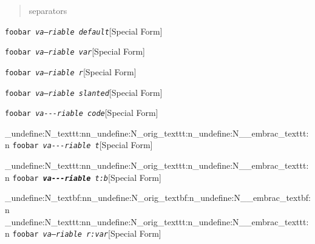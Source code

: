 \documentclass{book}
\begin{document}
%
\begin{quote}
\unskip{\parskip=0pt\noindent}%
separators
\end{quote}

\noindent\texttt{foobar \EmbracOn{}\textnormal{\textsl{va---riable default}}\EmbracOff{}}\hfill[Special Form]



%
\noindent\texttt{foobar \EmbracOn{}\textnormal{\textsl{\textsl{va---riable} var}}\EmbracOff{}}\hfill[Special Form]



%
\noindent\texttt{foobar \EmbracOn{}\textnormal{\textsl{\EmbracOff{}\textnormal{va---riable}\EmbracOn{} r}}\EmbracOff{}}\hfill[Special Form]



%
\noindent\texttt{foobar \EmbracOn{}\textnormal{\textsl{\textsl{va---riable} slanted}}\EmbracOff{}}\hfill[Special Form]



%
\noindent\texttt{foobar \EmbracOn{}\textnormal{\textsl{\texttt{va{-}{-}{-}riable} code}}\EmbracOff{}}\hfill[Special Form]


\ExplSyntaxOn%
\cs_undefine:N{\embrac_texttt:nn}\cs_undefine:N{\embrac_orig_texttt:n}\cs_undefine:N{\__embrac_texttt:n}%
\ExplSyntaxOff%
%
\noindent\texttt{foobar \EmbracOn{}\textnormal{\textsl{\texttt{va{-}{-}{-}riable} t}}\EmbracOff{}}\hfill[Special Form]


\ExplSyntaxOn%
\cs_undefine:N{\embrac_texttt:nn}\cs_undefine:N{\embrac_orig_texttt:n}\cs_undefine:N{\__embrac_texttt:n}%
\ExplSyntaxOff%
%
\noindent\texttt{foobar \EmbracOn{}\textnormal{\textsl{\texttt{\textbf{va{-}{-}{-}riable}} t:b}}\EmbracOff{}}\hfill[Special Form]


\ExplSyntaxOn%
\cs_undefine:N{\embrac_textbf:nn}\cs_undefine:N{\embrac_orig_textbf:n}\cs_undefine:N{\__embrac_textbf:n}%
\cs_undefine:N{\embrac_texttt:nn}\cs_undefine:N{\embrac_orig_texttt:n}\cs_undefine:N{\__embrac_texttt:n}%
\ExplSyntaxOff%
%
\noindent\texttt{foobar \EmbracOn{}\textnormal{\textsl{\EmbracOff{}\textnormal{\textsl{va---riable}}\EmbracOn{} r:var}}\EmbracOff{}}\hfill[Special Form]
\end{document}
